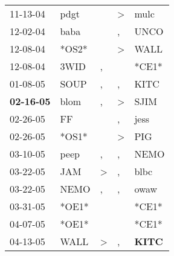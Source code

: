 \begin{supertabular}{p{0.07\textwidth}p{0.06\textwidth}p{0.02\textwidth}p{0.02\textwidth}p{0.06\textwidth}}
          11-13-04\textsuperscript{} &           pdgt\textsuperscript{} &                  &     \textgreater &           mulc\textsuperscript{} \\
          12-02-04\textsuperscript{} &           baba\textsuperscript{} &                  &                , &           UNCO\textsuperscript{} \\
          12-08-04\textsuperscript{} &                            *OS2* &                  &     \textgreater &           WALL\textsuperscript{} \\
          12-08-04\textsuperscript{} &           3WID\textsuperscript{} &                , &                  &                            *CE1* \\
          01-08-05\textsuperscript{} &           SOUP\textsuperscript{} &                , &                , &           KITC\textsuperscript{} \\
 \textbf{02-16-05\textsuperscript{}} &           blom\textsuperscript{} &                , &     \textgreater &           SJIM\textsuperscript{} \\
          02-26-05\textsuperscript{} &             FF\textsuperscript{} &                  &                , &           jess\textsuperscript{} \\
          02-26-05\textsuperscript{} &                            *OS1* &                  &     \textgreater &            PIG\textsuperscript{} \\
          03-10-05\textsuperscript{} &           peep\textsuperscript{} &                , &                , &           NEMO\textsuperscript{} \\
          03-22-05\textsuperscript{} &            JAM\textsuperscript{} &     \textgreater &                , &           blbc\textsuperscript{} \\
          03-22-05\textsuperscript{} &           NEMO\textsuperscript{} &                , &                , &           owaw\textsuperscript{} \\
          03-31-05\textsuperscript{} &                            *OE1* &                  &                  &                            *CE1* \\
          04-07-05\textsuperscript{} &                            *OE1* &                  &                  &                            *CE1* \\
          04-13-05\textsuperscript{} &           WALL\textsuperscript{} &     \textgreater &                , &  \textbf{KITC\textsuperscript{}} \\

\end{supertabular}
